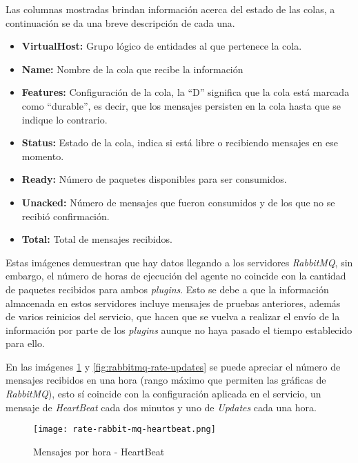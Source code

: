         Las columnas mostradas brindan información acerca del estado de las colas, a continuación se da una breve descripción de cada una.
        
        \begin{itemize}
            \setlength\itemsep{2em}
            \item \textbf{VirtualHost:} Grupo lógico de entidades al que pertenece la cola. \cite{virtualhost}
            \item \textbf{Name:} Nombre de la cola que recibe la información
            \item \textbf{Features:} Configuración de la cola, la ``D'' significa que la cola está marcada como ``durable'', es decir, que los mensajes persisten en la cola hasta que se indique lo contrario.
            \item \textbf{Status:} Estado de la cola, indica si está libre o recibiendo mensajes en ese momento.
            \item \textbf{Ready:} Número de paquetes disponibles para ser consumidos.
            \item \textbf{Unacked:} Número de mensajes que fueron consumidos y de los que no se recibió confirmación.
            \item \textbf{Total:} Total de mensajes recibidos.
        \end{itemize}{}
        
        Estas imágenes demuestran que hay datos llegando a los servidores \textit{RabbitMQ}, sin embargo, el número de horas de ejecución del agente no coincide con la cantidad de paquetes recibidos para ambos \textit{plugins}. Esto se debe a que la información almacenada en estos servidores incluye mensajes de pruebas anteriores, además de varios reinicios del servicio, que hacen que se vuelva a realizar el envío de la información por parte de los \textit{plugins} aunque no haya pasado el tiempo establecido para ello.
        
        En las imágenes \ref{fig:rabbitmq-rate-heartbeat} y \ref{fig:rabbitmq-rate-updates} se puede apreciar el número de mensajes recibidos en una hora (rango máximo que permiten las gráficas de \textit{RabbitMQ}), esto sí coincide con la configuración aplicada en el servicio, un mensaje de \textit{HeartBeat} cada dos minutos y uno de \textit{Updates} cada una hora.
        
        \begin{figure}[H]
        \centering
            \texttt{[image: rate-rabbit-mq-heartbeat.png]}
            \caption{Mensajes por hora - HeartBeat}
            \label{fig:rabbitmq-rate-heartbeat}
        \end{figure}
        
